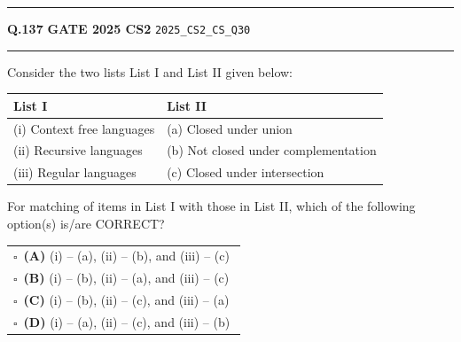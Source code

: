 \documentclass[a4paper,10pt]{article}
\begin{document}
\vspace{6pt}\hrule height 0.35pt\vspace{6pt}
\noindent
\begin{tcolorbox}[
    blanker,
    sidebyside,
    sidebyside align=top,
    lefthand width=0.55\textwidth,
    top=4pt, bottom=4pt, left=0pt, right=0pt,
    middle=16pt,
    underlay={
        \draw[dashed, black!80, line width=0.8pt, dash pattern=on 4pt off 3pt]
            ([xshift=0.55\textwidth+8pt]frame.north west) --
            ([xshift=0.55\textwidth+8pt]frame.south west);
    }
]
\textbf{Q.137}  \hfill {\footnotesize\textbf{GATE 2025 CS2} \quad \tiny\texttt{2025\_CS2\_CS\_Q30}}
\vspace{2pt}\hrule height 0.3pt\vspace{4pt}

Consider the two lists List I and List II given below:
\par\medskip
\begin{center}\small
\begin{tabular}{ll}
\toprule
List I & List II \\
\midrule
(i) Context free languages & (a) Closed under union \\
(ii) Recursive languages & (b) Not closed under complementation \\
(iii) Regular languages & (c) Closed under intersection \\
\bottomrule
\end{tabular}\end{center}
\par\medskip
For matching of items in List I with those in List II, which of the following option(s) is/are CORRECT?

\par\vspace{6pt}\noindent
\begin{tabular}{@{}p{0.98\linewidth}@{}}
$\square$\ \textbf{(A)} (i) – (a), (ii) – (b), and (iii) – (c) \\
\addlinespace[3pt]
$\square$\ \textbf{(B)} (i) – (b), (ii) – (a), and (iii) – (c) \\
\addlinespace[3pt]
$\square$\ \textbf{(C)} (i) – (b), (ii) – (c), and (iii) – (a) \\
\addlinespace[3pt]
$\square$\ \textbf{(D)} (i) – (a), (ii) – (c), and (iii) – (b)
\end{tabular}

\tcblower


\end{tcolorbox}
\end{document}
